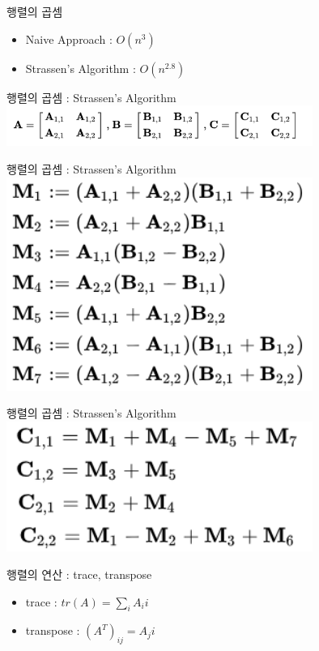 \documentclass{beamer}
\begin{document}
\begin{frame}{행렬의 곱셈} 
\begin{itemize}
\item Naive Approach : $O(n^3)$
\item Strassen's Algorithm : $O(n^{2.8})$
\end{itemize}
\end{frame}

\begin{frame}{행렬의 곱셈 : Strassen's Algorithm} 
\includegraphics[width=10cm,keepaspectratio]{st1}
\end{frame}

\begin{frame}{행렬의 곱셈 : Strassen's Algorithm} 
\includegraphics[width=10cm,keepaspectratio]{st2}

\end{frame}

\begin{frame}{행렬의 곱셈 : Strassen's Algorithm} 
\includegraphics[width=10cm,keepaspectratio]{st3}

\end{frame}



\begin{frame}{행렬의 연산 : trace, transpose} 
\begin{itemize} 
\item trace : $tr(A) = \sum_i A_ii$
\item transpose : $(A^{T})_{ij} = A_ji$
\end{itemize}
\end{frame}
\end{document}
